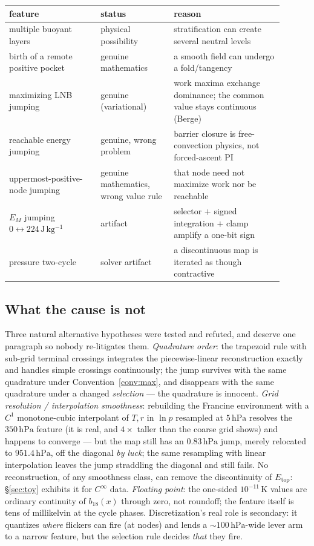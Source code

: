 \documentclass[11pt,a4paper]{article}
\theoremstyle{definition}
\newcommand{\Etop}{E_{\mathrm{top}}}
\newcommand{\hPa}{\,\mathrm{hPa}}
\newcommand{\Jkg}{\,\mathrm{J\,kg^{-1}}}
\newcommand{\K}{\,\mathrm{K}}
\begin{document}
\begin{center}
\small
\begin{tabular}{@{}>{\raggedright\arraybackslash}p{0.30\linewidth}>{\raggedright\arraybackslash}p{0.24\linewidth}>{\raggedright\arraybackslash}p{0.36\linewidth}@{}}
\toprule
feature & status & reason \\
\midrule
multiple buoyant layers & physical possibility & stratification can create
several neutral levels \\
birth of a remote positive pocket & genuine mathematics & a smooth field can
undergo a fold/tangency \\
maximizing LNB jumping & genuine (variational) & work maxima exchange
dominance; the common value stays continuous (Berge) \\
reachable energy jumping & genuine, wrong problem & barrier closure is
free-convection physics, not forced-ascent PI \\
uppermost-positive-node jumping & genuine mathematics, wrong value rule &
that node need not maximize work nor be reachable \\
$E_M$ jumping $0\leftrightarrow224\Jkg$ & artifact & selector $+$ signed
integration $+$ clamp amplify a one-bit sign \\
pressure two-cycle & solver artifact & a discontinuous map is iterated as
though contractive \\
\bottomrule
\end{tabular}
\end{center}

\subsection{What the cause is not}\label{sec:notcause}

Three natural alternative hypotheses were tested and refuted, and deserve
one paragraph so nobody re-litigates them.  \emph{Quadrature order}: the
trapezoid rule with sub-grid terminal crossings integrates the
piecewise-linear reconstruction exactly and handles simple crossings
continuously; the jump survives with the same quadrature under
Convention~\ref{conv:max}, and disappears with the same quadrature under a
changed \emph{selection} --- the quadrature is innocent.  \emph{Grid
resolution / interpolation smoothness}: rebuilding the Francine environment
with a $C^1$ monotone-cubic interpolant of $T,r$ in $\ln p$ resampled at
$5\hPa$ resolves the $350\hPa$ feature (it is real, and $4\times$ taller
than the coarse grid shows) and happens to converge --- but the map still
has an $0.83\hPa$ jump, merely relocated to $951.4\hPa$, off the diagonal
\emph{by luck}; the same resampling with linear interpolation leaves the
jump straddling the diagonal and still fails.  No reconstruction, of any
smoothness class, can remove the discontinuity of $\Etop$: \S\ref{sec:toy}
exhibits it for $C^\infty$ data.  \emph{Floating point}: the one-sided
$10^{-11}\K$ values are ordinary continuity of $b_{18}(x)$ through zero, not
roundoff; the feature itself is tens of millikelvin at the cycle phases.
Discretization's real role is secondary: it quantizes \emph{where} flickers
can fire (at nodes) and lends a $\sim100\hPa$-wide lever arm to a narrow
feature, but the selection rule decides \emph{that} they fire.
\end{document}
